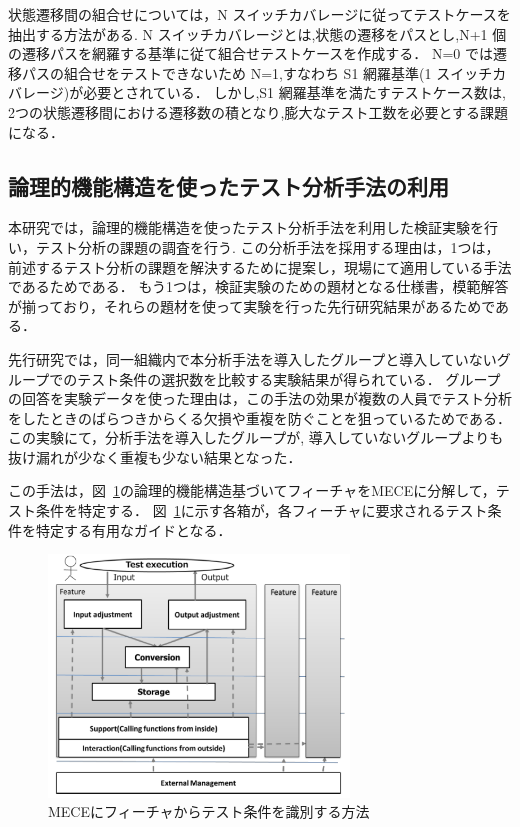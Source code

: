 \documentclass[a4paper,11pt]{jreport}
\begin{document}
状態遷移間の組合せについては，N スイッチカバレージに従ってテストケースを抽出する方法がある. \cite{beiz90}
N スイッチカバレージとは,状態の遷移をパスとし,N+1 個の遷移パスを網羅する基準に従て組合せテストケースを作成する．
N=0 では遷移パスの組合せをテストできないため N=1,すなわち S1 網羅基準(1 スイッチカバレージ)が必要とされている．
しかし,S1 網羅基準を満たすテストケース数は, 2つの状態遷移間における遷移数の積となり,膨大なテスト工数を必要とする課題になる．

\subsection{論理的機能構造を使ったテスト分析手法の利用}
本研究では，論理的機能構造を使ったテスト分析手法を利用した検証実験を行い，テスト分析の課題の調査を行う\cite{yumoto2013test}.
この分析手法を採用する理由は，1つは，前述するテスト分析の課題を解決するために提案し，現場にて適用している手法であるためである．
もう1つは，検証実験のための題材となる仕様書，模範解答が揃っており，それらの題材を使って実験を行った先行研究結果があるためである．

先行研究では，同一組織内で本分析手法を導入したグループと導入していないグループでのテスト条件の選択数を比較する実験結果が得られている．
グループの回答を実験データを使った理由は，この手法の効果が複数の人員でテスト分析をしたときのばらつきからくる欠損や重複を防ぐことを狙っているためである．
この実験にて，分析手法を導入したグループが, 導入していないグループよりも抜け漏れが少なく重複も少ない結果となった．

この手法は，図~\ref{fig:D-3-Fig3}の論理的機能構造基づいてフィーチャをMECEに分解して，テスト条件を特定する．
図~\ref{fig:D-3-Fig3}に示す各箱が，各フィーチャに要求されるテスト条件を特定する有用なガイドとなる．

\begin{figure}[h]
  \begin{center}
	\includegraphics[width=8cm]{./image/D-3-Fig3.png}
	\caption{MECEにフィーチャからテスト条件を識別する方法}
	\label{fig:D-3-Fig3}
  \end{center}
\end{figure}
\end{document}
